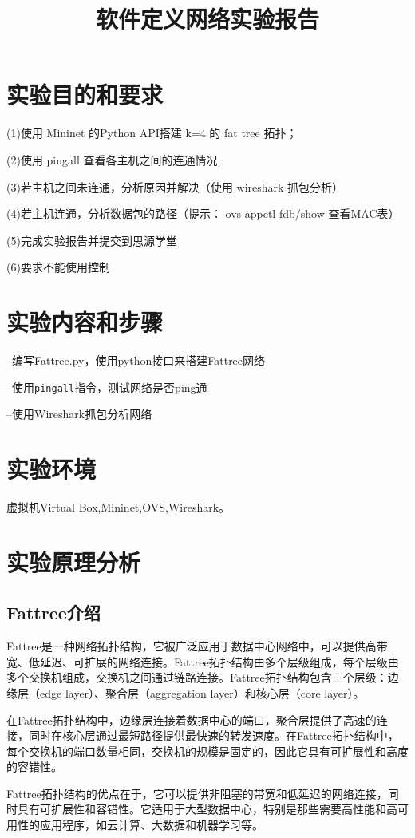 \documentclass{xjtureport}
\title{软件定义网络实验报告}
\date{\zhtoday}
\begin{document}
\makecover
\makeheader


\section{实验目的和要求}
(1)使用 Mininet 的Python API搭建 k=4 的 fat tree 拓扑；\par
(2)使用 pingall 查看各主机之间的连通情况;\par
(3)若主机之间未连通，分析原因并解决（使用 wireshark 抓包分析）\par
(4)若主机连通，分析数据包的路径（提示： ovs-appctl fdb/show 查看MAC表）\par
(5)完成实验报告并提交到思源学堂\par
(6)要求不能使用控制\par
\section{实验内容和步骤}
–编写Fattree.py，使用python接口来搭建Fattree网络\par
–使用\texttt{pingall}指令，测试网络是否ping通\par
–使用Wireshark抓包分析网络\par
\section{实验环境}
虚拟机Virtual Box,Mininet,OVS,Wireshark。
\section{实验原理分析}
\subsection{Fattree介绍}
Fattree是一种网络拓扑结构，它被广泛应用于数据中心网络中，可以提供高带宽、低延迟、可扩展的网络连接。Fattree拓扑结构由多个层级组成，每个层级由多个交换机组成，交换机之间通过链路连接。Fattree拓扑结构包含三个层级：边缘层（edge layer）、聚合层（aggregation layer）和核心层（core layer）。\par
在Fattree拓扑结构中，边缘层连接着数据中心的端口，聚合层提供了高速的连接，同时在核心层通过最短路径提供最快速的转发速度。在Fattree拓扑结构中，每个交换机的端口数量相同，交换机的规模是固定的，因此它具有可扩展性和高度的容错性。\par
Fattree拓扑结构的优点在于，它可以提供非阻塞的带宽和低延迟的网络连接，同时具有可扩展性和容错性。它适用于大型数据中心，特别是那些需要高性能和高可用性的应用程序，如云计算、大数据和机器学习等。\par
\end{document}
